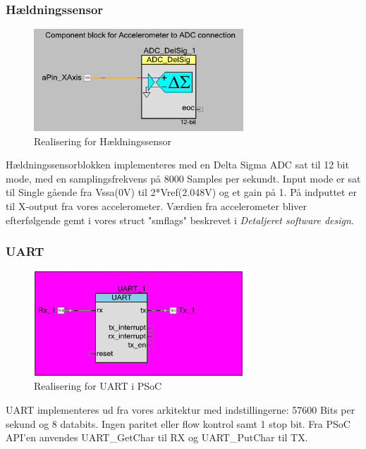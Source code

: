 \subsubsection{Hældningssensor}
\begin{figure}[H]
\centering
\includegraphics[width=0.7\textwidth]{billeder/levelsensor}
\caption{Realisering for Hældningssensor}
\label{fig:SMLEVEL}
\end{figure}
Hældningssensorblokken implementeres med en Delta Sigma ADC sat til 12 bit mode, med en samplingsfrekvens på 8000 Samples per sekundt. Input mode er sat til Single gående fra Vssa(0V) til 2*Vref(2.048V) og et gain på 1. På indputtet er til X-output fra vores accelerometer. Værdien fra accelerometer bliver efterfølgende gemt i vores struct "smflags" beskrevet i \textit{Detaljeret software design}.
\subsubsection{UART}
\begin{figure}[H]
\centering
\includegraphics[width=0.7\textwidth]{billeder/uartpsoc}
\caption{Realisering for UART i PSoC}
\label{fig:SMUARTR}
\end{figure}
UART implementeres ud fra vores arkitektur med indstillingerne: 57600 Bits per sekund og 8 databits. Ingen paritet eller flow kontrol samt 1 stop bit. Fra PSoC API'en anvendes UART\_GetChar til RX og UART\_PutChar til TX. 
